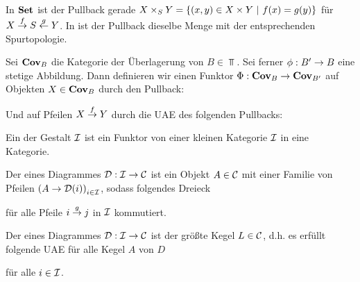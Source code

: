 In $\textbf{Set}$ ist der Pullback gerade $X\times_S Y = \left\lbrace (x,y) \in X \times Y~|~f(x) = g(y) \right\rbrace$ für $X \overset{f}{\rightarrow} S \overset{g}{\leftarrow} Y$. In \Top ist der Pullback dieselbe Menge mit der entsprechenden Spurtopologie.

Sei $\textbf{Cov}_B$ die Kategorie der Überlagerung von $B \in \Top$. Sei ferner $\phi : B' \overset{}{\rightarrow} B$ eine stetige Abbildung. Dann definieren wir einen Funktor $\Phi : \textbf{Cov}_B \rightarrow \textbf{Cov}_{B'}$ auf Objekten $X \in \textbf{Cov}_B$ durch den Pullback:
\begin{center}
\end{center}
Und auf Pfeilen $X \overset{f}{\rightarrow} Y$ durch die UAE des folgenden Pullbacks:

\begin{center}
\end{center}


Ein  der Gestalt $\mathcal{I}$ ist ein Funktor von einer kleinen Kategorie $\mathcal{I}$ in eine Kategorie.

Der  eines Diagrammes $\mathcal{D} : \mathcal{I} \rightarrow \mathcal{C}$ ist ein Objekt $A \in \mathcal{C}$ mit einer Familie von Pfeilen $\left(A \rightarrow \mathcal{D}(i)\right)_{i\in \mathcal{I}}$, sodass folgendes Dreieck
\begin{center}
\end{center}
für alle Pfeile $i\overset{g}{\rightarrow} j$ in $\mathcal{I}$ kommutiert.

Der  eines Diagrammes $\mathcal{D} : \mathcal{I} \rightarrow \mathcal{C}$ ist der größte Kegel $L \in \mathcal{C}$, d.h. es erfüllt folgende UAE für alle Kegel $A$ von $D$
\begin{center}
\end{center}
für alle $i\in\mathcal{I}$.

